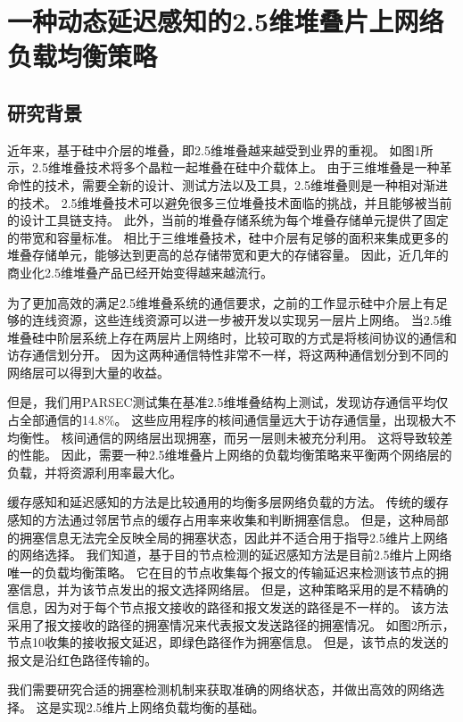 \chapter{一种动态延迟感知的2.5维堆叠片上网络负载均衡策略}
\label{chap:DLL}

\section{研究背景}

近年来，基于硅中介层的堆叠，即2.5维堆叠越来越受到业界的重视。
如图1所示，2.5维堆叠技术将多个晶粒一起堆叠在硅中介载体上。
由于三维堆叠是一种革命性的技术，需要全新的设计、测试方法以及工具，2.5维堆叠则是一种相对渐进的技术。
2.5维堆叠技术可以避免很多三位堆叠技术面临的挑战，并且能够被当前的设计工具链支持。
此外，当前的堆叠存储系统为每个堆叠存储单元提供了固定的带宽和容量标准。
相比于三维堆叠技术，硅中介层有足够的面积来集成更多的堆叠存储单元，能够达到更高的总存储带宽和更大的存储容量。
因此，近几年的商业化2.5维堆叠产品已经开始变得越来越流行。

为了更加高效的满足2.5维堆叠系统的通信要求，之前的工作显示硅中介层上有足够的连线资源，这些连线资源可以进一步被开发以实现另一层片上网络。
当2.5维堆叠硅中阶层系统上存在两层片上网络时，比较可取的方式是将核间协议的通信和访存通信划分开。
因为这两种通信特性非常不一样，将这两种通信划分到不同的网络层可以得到大量的收益。

但是，我们用PARSEC测试集在基准2.5维堆叠结构上测试，发现访存通信平均仅占全部通信的14.8\%。
这些应用程序的核间通信量远大于访存通信量，出现极大不均衡性。
核间通信的网络层出现拥塞，而另一层则未被充分利用。
这将导致较差的性能。
因此，需要一种2.5维堆叠片上网络的负载均衡策略来平衡两个网络层的负载，并将资源利用率最大化。

缓存感知和延迟感知的方法是比较通用的均衡多层网络负载的方法。
传统的缓存感知的方法通过邻居节点的缓存占用率来收集和判断拥塞信息。
但是，这种局部的拥塞信息无法完全反映全局的拥塞状态，因此并不适合用于指导2.5维片上网络的网络选择。
我们知道，基于目的节点检测的延迟感知方法是目前2.5维片上网络唯一的负载均衡策略。
它在目的节点收集每个报文的传输延迟来检测该节点的拥塞信息，并为该节点发出的报文选择网络层。
但是，这种策略采用的是不精确的信息，因为对于每个节点报文接收的路径和报文发送的路径是不一样的。
该方法采用了报文接收的路径的拥塞情况来代表报文发送路径的拥塞情况。
如图2所示，节点10收集的接收报文延迟，即绿色路径作为拥塞信息。
但是，该节点的发送的报文是沿红色路径传输的。

我们需要研究合适的拥塞检测机制来获取准确的网络状态，并做出高效的网络选择。
这是实现2.5维片上网络负载均衡的基础。

